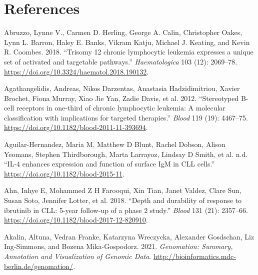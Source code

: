 \documentclass[11pt, a4paper, twosided]{book}
\newenvironment{CSLReferences}%
  {}%
  {\par}
\begin{document}
\newpage

\hypertarget{references}{%
\chapter*{References}\label{references}}

\noindent

\setlength{\parindent}{-0.5cm}
\setlength{\leftskip}{0.5cm}
\setlength{\parskip}{8pt}

\hypertarget{refs}{}
\begin{CSLReferences}{1}{0}
\leavevmode{}%
Abruzzo, Lynne V., Carmen D. Herling, George A. Calin, Christopher Oakes, Lynn L. Barron, Haley E. Banks, Vikram Katju, Michael J. Keating, and Kevin R. Coombes. 2018. {``{Trisomy 12 chronic lymphocytic leukemia expresses a unique set of activated and targetable pathways}.''} \emph{Haematologica} 103 (12): 2069--78. \url{https://doi.org/10.3324/haematol.2018.190132}.

\leavevmode{}%
Agathangelidis, Andreas, Nikos Darzentas, Anastasia Hadzidimitriou, Xavier Brochet, Fiona Murray, Xiao Jie Yan, Zadie Davis, et al. 2012. {``{Stereotyped B-cell receptors in one-third of chronic lymphocytic leukemia: A molecular classification with implications for targeted therapies}.''} \emph{Blood} 119 (19): 4467--75. \url{https://doi.org/10.1182/blood-2011-11-393694}.

\leavevmode{}%
Aguilar-Hernandez, Maria M, Matthew D Blunt, Rachel Dobson, Alison Yeomans, Stephen Thirdborough, Marta Larrayoz, Lindsay D Smith, et al. n.d. {``{IL-4 enhances expression and function of surface IgM in CLL cells}.''} \url{https://doi.org/10.1182/blood-2015-11}.

\leavevmode{}%
Ahn, Inhye E, Mohammed Z H Farooqui, Xin Tian, Janet Valdez, Clare Sun, Susan Soto, Jennifer Lotter, et al. 2018. {``{Depth and durability of response to ibrutinib in CLL: 5-year follow-up of a phase 2 study.}''} \emph{Blood} 131 (21): 2357--66. \url{https://doi.org/10.1182/blood-2017-12-820910}.

\leavevmode{}%
Akalin, Altuna, Vedran Franke, Katarzyna Wreczycka, Alexander Gosdschan, Liz Ing-Simmons, and Bozena Mika-Gospodorz. 2021. \emph{Genomation: Summary, Annotation and Visualization of Genomic Data}. \url{http://bioinformatics.mdc-berlin.de/genomation/}.


\end{CSLReferences}
\end{document}
